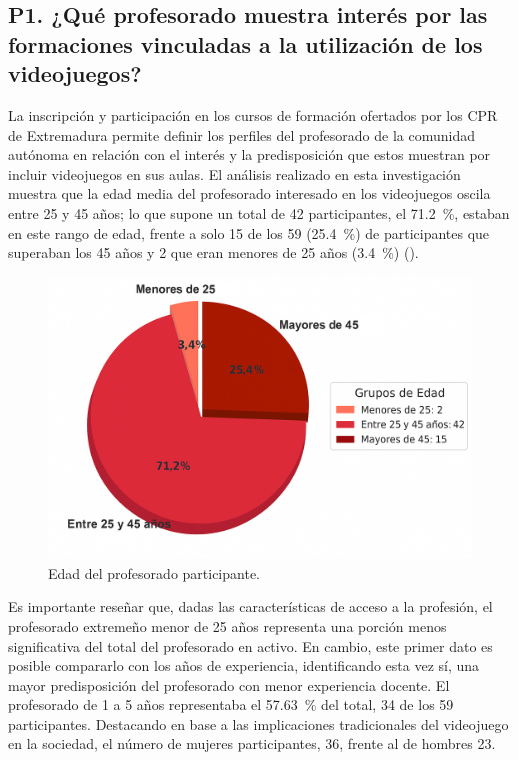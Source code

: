 \documentclass[spanish]{textolivre}
\begin{document}
\subsection{P1. ¿Qué profesorado muestra interés por las formaciones vinculadas a la utilización de los videojuegos?}\label{sec-idioma}
La inscripción y participación en los cursos de formación ofertados por los CPR de Extremadura permite definir los perfiles del profesorado de la comunidad autónoma en relación con el interés y la predisposición que estos muestran por incluir videojuegos en sus aulas. El análisis realizado en esta investigación muestra que la edad media del profesorado interesado en los videojuegos oscila entre 25 y 45 años; lo que supone un total de 42 participantes, el 71.2~\%, estaban en este rango de edad, frente a solo 15 de los 59 (25.4~\%) de participantes que superaban los 45 años y 2 que eran menores de 25 años (3.4~\%) ().

\begin{figure}[h!]
    \centering
    \begin{minipage}{0.75\linewidth}
    \includegraphics[width=\linewidth]{Fig2.png}
    \caption{Edad del profesorado participante.}
    \label{fig2}
    \end{minipage}
\end{figure}

Es importante reseñar que, dadas las características de acceso a la profesión, el profesorado extremeño menor de 25 años representa una porción menos significativa del total del profesorado en activo. En cambio, este primer dato es posible compararlo con los años de experiencia, identificando esta vez sí, una mayor predisposición del profesorado con menor experiencia docente. El profesorado de 1 a 5 años representaba el 57.63~\% del total, 34 de los 59 participantes. Destacando en base a las implicaciones tradicionales del videojuego en la sociedad, el número de mujeres participantes, 36, frente al de hombres 23.
\end{document}
